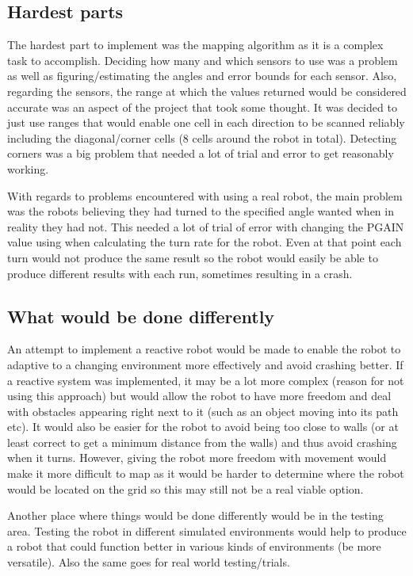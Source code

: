 \documentclass[a4paper,12pt]{article}
\begin{document}
\subsection{Hardest parts}
\noindent The hardest part to implement was the mapping algorithm as it is a complex task to accomplish. Deciding how many and which sensors to use was a problem as well as figuring/estimating the angles and error bounds for each sensor. Also, regarding the sensors, the range at which the values returned would be considered accurate was an aspect of the project that took some thought. It was decided to just use ranges that would enable one cell in each direction to be scanned reliably including the diagonal/corner cells (8 cells around the robot in total). Detecting corners was a big problem that needed a lot of trial and error to get reasonably working.

\vspace{5mm}
\noindent With regards to problems encountered with using a real robot, the main problem was the robots believing they had turned to the specified angle wanted when in reality they had not. This needed a lot of trial of error with changing the PGAIN value using when calculating the turn rate for the robot. Even at that point each turn would not produce the same result so the robot would easily be able to produce different results with each run, sometimes resulting in a crash.

\subsection{What would be done differently}
\noindent An attempt to implement a reactive robot would be made to enable the robot to adaptive to a changing environment more effectively and avoid crashing better. If a reactive system was implemented, it may be a lot more complex (reason for not using this approach) but would allow the robot to have more freedom and deal with obstacles appearing right next to it (such as an object moving into its path etc). It would also be easier for the robot to avoid being too close to walls (or at least correct to get a minimum distance from the walls) and thus avoid crashing when it turns. However, giving the robot more freedom with movement would make it more difficult to map as it would be harder to determine where the robot would be located on the grid so this may still not be a real viable option.

\vspace{5mm}
\noindent Another place where things would be done differently would be in the testing area. Testing the robot in different simulated environments would help to produce a robot that could function better in various kinds of environments (be more versatile). Also the same goes for real world testing/trials.
\end{document}
